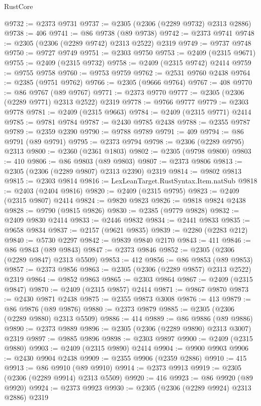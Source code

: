 \begin{lexlean}{RustCore}
\begin{coremodule}
@9732 := @2373 @9731
@9737 := @2305 (@2306 (@2289 @9732) @2313 @2886)
@9738 := 406
@9741 := @86 @9738 (@89 @9738)
@9742 := @2373 @9741
@9748 := @2305 (@2306 (@2289 @9742) @2313 @2522) @2319
@9749 := @9737 @9748
@9750 := @9727 @9749
@9751 := @2303 @9750
@9753 := @2409 (@2315 @9671)
@9755 := @2409 (@2315 @9732)
@9758 := @2409 (@2315 @9742) @2414
@9759 := @9755 @9758
@9760 := @9753 @9759
@9762 := @2531 @9760 @2438
@9764 := @2385 (@9751 @9762)
@9766 := @2305 (@9666 @9764)
@9767 := 408
@9770 := @86 @9767 (@89 @9767)
@9771 := @2373 @9770
@9777 := @2305 (@2306 (@2289 @9771) @2313 @2522) @2319
@9778 := @9766 @9777
@9779 := @2303 @9778
@9781 := @2409 (@2315 @9663)
@9784 := @2409 (@2315 @9771) @2414
@9785 := @9781 @9784
@9787 := @2430 @9785 @2438
@9788 := @2355 @9787
@9789 := @2359 @2390
@9790 := @9788 @9789
@9791 := 409
@9794 := @86 @9791 (@89 @9791)
@9795 := @2373 @9794
@9798 := @2306 (@2289 @9795) @2313
@9800 := @2360 (@2361 @1803)
@9802 := @2305 (@9798 @9800)
@9803 := 410
@9806 := @86 @9803 (@89 @9803)
@9807 := @2373 @9806
@9813 := @2305 (@2306 (@2289 @9807) @2313 @2390) @2319
@9814 := @9802 @9813
@9815 := @2303 @9814
@9816 := LexLeanTarget.RustSyntax.Item.natSub
@9818 := @2403 (@2404 @9816)
@9820 := @2409 (@2315 @9795)
@9823 := @2409 (@2315 @9807) @2414
@9824 := @9820 @9823
@9826 := @9818 @9824 @2438
@9828 := @9790 (@9815 @9826)
@9830 := @2385 (@9779 @9828)
@9832 := @2409 @9830 @2414
@9833 := @2446 @9832
@9834 := @2441 @9833
@9835 := @9658 @9834
@9837 := @2157 (@9621 @9835)
@9839 := @2280 (@2283 @212)
@9840 := @5730 @2297
@9842 := @9839 @9840 @2170
@9843 := 411
@9846 := @86 @9843 (@89 @9843)
@9847 := @2373 @9846
@9852 := @2305 (@2306 (@2289 @9847) @2313 @5509)
@9853 := 412
@9856 := @86 @9853 (@89 @9853)
@9857 := @2373 @9856
@9863 := @2305 (@2306 (@2289 @9857) @2313 @2522) @2319
@9864 := @9852 @9863
@9865 := @2303 @9864
@9867 := @2409 (@2315 @9847)
@9870 := @2409 (@2315 @9857) @2414
@9871 := @9867 @9870
@9873 := @2430 @9871 @2438
@9875 := @2355 @9873 @3008
@9876 := 413
@9879 := @86 @9876 (@89 @9876)
@9880 := @2373 @9879
@9885 := @2305 (@2306 (@2289 @9880) @2313 @5509)
@9886 := 414
@9889 := @86 @9886 (@89 @9886)
@9890 := @2373 @9889
@9896 := @2305 (@2306 (@2289 @9890) @2313 @3007) @2319
@9897 := @9885 @9896
@9898 := @2303 @9897
@9900 := @2409 (@2315 @9880)
@9903 := @2409 (@2315 @9890) @2414
@9904 := @9900 @9903
@9906 := @2430 @9904 @2438
@9909 := @2355 @9906 (@2359 @2886)
@9910 := 415
@9913 := @86 @9910 (@89 @9910)
@9914 := @2373 @9913
@9919 := @2305 (@2306 (@2289 @9914) @2313 @5509)
@9920 := 416
@9923 := @86 @9920 (@89 @9920)
@9924 := @2373 @9923
@9930 := @2305 (@2306 (@2289 @9924) @2313 @2886) @2319

\end{coremodule}
\end{lexlean}
